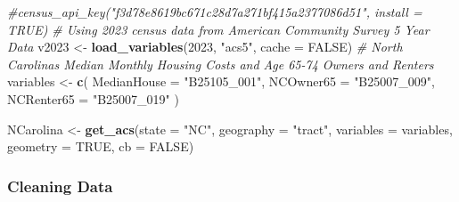 \documentclass[
]{article}
\newenvironment{Shaded}{\begin{snugshade}}{\end{snugshade}}
\newcommand{\AttributeTok}[1]{\textcolor[rgb]{0.13,0.29,0.53}{#1}}
\newcommand{\CommentTok}[1]{\textcolor[rgb]{0.56,0.35,0.01}{\textit{#1}}}
\newcommand{\ConstantTok}[1]{\textcolor[rgb]{0.56,0.35,0.01}{#1}}
\newcommand{\DecValTok}[1]{\textcolor[rgb]{0.00,0.00,0.81}{#1}}
\newcommand{\FunctionTok}[1]{\textcolor[rgb]{0.13,0.29,0.53}{\textbf{#1}}}
\newcommand{\NormalTok}[1]{#1}
\newcommand{\OtherTok}[1]{\textcolor[rgb]{0.56,0.35,0.01}{#1}}
\newcommand{\StringTok}[1]{\textcolor[rgb]{0.31,0.60,0.02}{#1}}
\begin{document}
\begin{Shaded}
\begin{Highlighting}[]
\CommentTok{\#census\_api\_key("f3d78e8619bc671c28d7a271bf415a2377086d51", install = TRUE)}
\CommentTok{\# Using 2023 census data from American Community Survey 5 Year Data}
\NormalTok{v2023 }\OtherTok{\textless{}{-}} \FunctionTok{load\_variables}\NormalTok{(}\DecValTok{2023}\NormalTok{, }\StringTok{"acs5"}\NormalTok{, }\AttributeTok{cache =} \ConstantTok{FALSE}\NormalTok{)}
\CommentTok{\# North Carolina\textquotesingle{}s Median Monthly Housing Costs and Age 65{-}74 Owners and Renters}
\NormalTok{variables }\OtherTok{\textless{}{-}} \FunctionTok{c}\NormalTok{(}
  \AttributeTok{MedianHouse =} \StringTok{"B25105\_001"}\NormalTok{,}
  \AttributeTok{NCOwner65 =} \StringTok{"B25007\_009"}\NormalTok{,}
  \AttributeTok{NCRenter65 =} \StringTok{"B25007\_019"}
\NormalTok{)}

\NormalTok{NCarolina }\OtherTok{\textless{}{-}} \FunctionTok{get\_acs}\NormalTok{(}\AttributeTok{state =} \StringTok{"NC"}\NormalTok{, }\AttributeTok{geography =} \StringTok{"tract"}\NormalTok{, }\AttributeTok{variables =}\NormalTok{ variables, }\AttributeTok{geometry =} \ConstantTok{TRUE}\NormalTok{, }\AttributeTok{cb =} \ConstantTok{FALSE}\NormalTok{)}
\end{Highlighting}
\end{Shaded}

\subsubsection{Cleaning Data}\label{cleaning-data}
\end{document}
